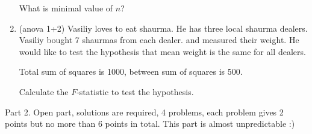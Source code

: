 \documentclass[12pt]{article}
\begin{document}
\begin{enumerate}
    What is minimal value of $n$?


    \item (anova 1+2) Vasiliy loves to eat shaurma. He has three local shaurma dealers. Vasiliy bought 7 shaurmas from each dealer. 
    and measured their weight. He would like to test the hypothesis that mean weight is the same for all dealers. 

    Total sum of squares is 1000, between sum of squares is 500. 

    Calculate the $F$-statistic to test the hypothesis.
        
\end{enumerate}

\newpage
Part 2. Open part, solutions are required, 4 problems, each problem gives 2 points but no more than 6 points in total.
This part is almost unpredictable :)
\end{document}
